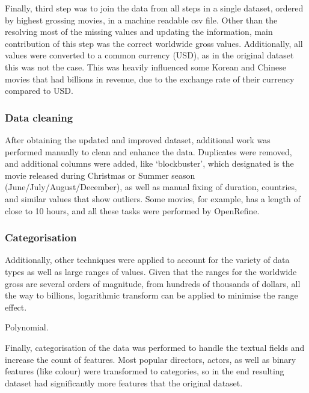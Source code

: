 Finally, third step was to join the data from all steps in a single dataset, ordered by highest grossing movies, in a machine readable csv file. Other than the resolving most of the missing values and updating the information, main contribution of this step was the correct worldwide gross values. Additionally, all values were converted to a common currency (USD), as in the original dataset this was not the case. This was heavily influenced some Korean and Chinese movies that had billions in revenue, due to the exchange rate of their currency compared to USD.
\subsubsection{Data cleaning}
After obtaining the updated and improved dataset, additional work was performed manually to clean and enhance the data. Duplicates were removed, and additional columns were added, like ‘blockbuster’, which designated is the movie released during Christmas or Summer season (June/July/August/December), as well as manual fixing of duration, countries, and similar values that show outliers. Some movies, for example, has a length of close to 10 hours, and all these tasks were performed by OpenRefine.

\subsubsection{Categorisation}
Additionally, other techniques were applied to account for the variety of data types as well as large ranges of values. Given that the ranges for the worldwide gross are several orders of magnitude, from hundreds of thousands of dollars, all the way to billions, logarithmic transform can be applied to minimise the range effect.

Polynomial.

Finally, categorisation of the data was performed to handle the textual fields and increase the count of features. Most popular directors, actors, as well as binary features (like colour) were transformed to categories, so in the end resulting dataset had significantly more features that the original dataset.
